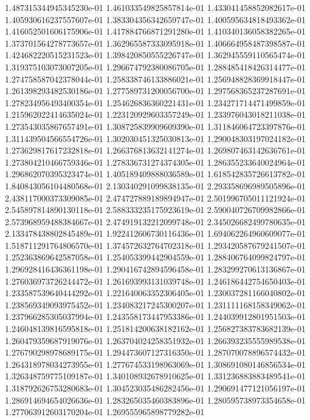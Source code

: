1.487315344945345230e-01
1.461033549825857814e-01
1.433041458852082617e-01
1.405930616237557607e-01
1.383304356342659747e-01
1.400595634818493362e-01
1.416052501606175906e-01
1.417884766871291280e-01
1.410340136058382265e-01
1.373701564278773657e-01
1.362965587333095918e-01
1.406664958487398587e-01
1.424682220515231523e-01
1.398420850555226747e-01
1.362945559110565474e-01
1.319375103073007205e-01
1.296674792380086705e-01
1.288485418426314477e-01
1.274758587042378044e-01
1.258338746133886021e-01
1.256948828369918447e-01
1.261398293482530186e-01
1.277589731200056700e-01
1.297568365237287691e-01
1.278234956493400354e-01
1.254626836360221431e-01
1.234271714471499859e-01
1.215962022414635024e-01
1.223120929603357249e-01
1.233976043018211038e-01
1.273543035867657491e-01
1.308725839909609390e-01
1.311846064723397876e-01
1.311439504566554726e-01
1.302030451325030813e-01
1.290048303197024182e-01
1.273629817617232818e-01
1.266376813632141274e-01
1.269807463142636761e-01
1.273804210466759346e-01
1.278336731274374305e-01
1.286355233640024964e-01
1.296862070395323474e-01
1.405189409888036589e-01
1.618542835726613782e-01
1.840843056104480568e-01
2.130340291099838135e-01
2.293358696989505896e-01
2.438117000373309085e-01
2.474727889189894947e-01
2.501996705011121924e-01
2.545897814890130118e-01
2.588333235175923619e-01
2.590040726709982866e-01
2.573968959488384667e-01
2.474919132212099748e-01
2.345026682499780635e-01
2.133478438802845489e-01
1.922412606730116436e-01
1.694062264960609077e-01
1.518711291764806570e-01
1.374572632764702318e-01
1.293420587679241507e-01
1.252363869642587058e-01
1.254053399442904559e-01
1.288406764099824797e-01
1.296928416436361198e-01
1.290416742894596458e-01
1.283299270613136867e-01
1.276036973726244472e-01
1.261693993131039748e-01
1.246186442754650403e-01
1.233587539640444292e-01
1.221640063352306405e-01
1.230037281166040802e-01
1.238569349093975452e-01
1.234083217245300207e-01
1.231111168158349062e-01
1.237966285305037994e-01
1.243558173447953386e-01
1.244039912801951503e-01
1.246048139816595818e-01
1.251814200638182162e-01
1.256827383783682139e-01
1.260479359687919076e-01
1.263704024258351932e-01
1.266393235555989538e-01
1.276790298978689175e-01
1.294473607127316350e-01
1.287070078896574432e-01
1.264318978034273955e-01
1.277674533198963069e-01
1.308691080146856534e-01
1.326348759775109187e-01
1.340108932678910625e-01
1.331236883883489541e-01
1.318792626753280683e-01
1.304523035486282456e-01
1.290691477121056197e-01
1.286914694654026636e-01
1.283265035460383896e-01
1.280595738973354658e-01
1.277063912603170204e-01
1.269555965898779282e-01
